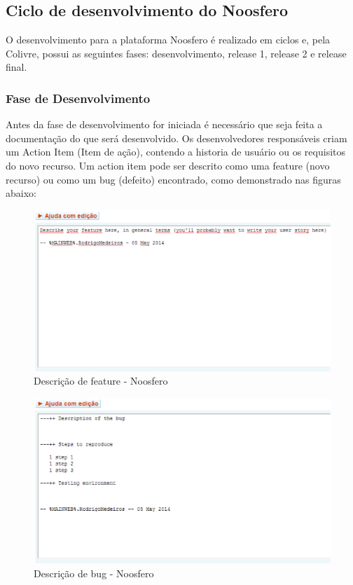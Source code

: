 \subsection{Ciclo de desenvolvimento do Noosfero}
%
O desenvolvimento para a plataforma Noosfero é realizado em ciclos e, pela Colivre, 
possui as seguintes fases: desenvolvimento, release 1, release 2 e release final.
%
\subsubsection{Fase de Desenvolvimento}
%
Antes da fase de desenvolvimento for iniciada é necessário que seja feita a 
documentação do que será desenvolvido. Os desenvolvedores responsáveis criam um 
Action Item (Item de ação), contendo a historia de usuário ou os requisitos do novo 
recurso. Um action item pode ser descrito como uma feature (novo recurso) ou como 
um bug (defeito) encontrado, como demonstrado nas figuras abaixo:
%
\begin{figure}[!h]
    \centering
    \includegraphics[keepaspectratio=true,scale=0.65]
      {figuras/noosfero_feature.eps}
    \caption{Descrição de feature - Noosfero}
    \label{noosfero_feature}
\end{figure}
%
\begin{figure}[!h]
    \centering
    \includegraphics[keepaspectratio=true,scale=0.65]
      {figuras/noosfero_bug.eps}
    \caption{Descrição de bug - Noosfero}
    \label{noosfero_bug}
\end{figure}

